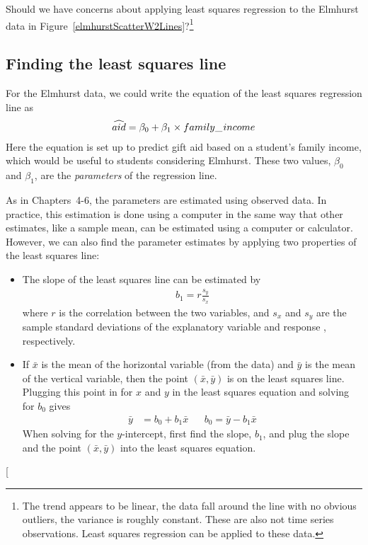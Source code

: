 \begin{exercise}
Should we have concerns about applying least squares regression to the Elmhurst data in Figure~\ref{elmhurstScatterW2Lines}?\footnote{The trend appears to be linear, the data fall around the line with no obvious outliers, the variance is roughly constant. These are also not time series observations. Least squares regression can be applied to these data.}
\end{exercise}

\subsection{Finding the least squares line}
\label{findingTheLeastSquaresLineSection}

For the Elmhurst data, we could write the equation of the least squares regression line as
\begin{eqnarray*}
\widehat{aid} = \beta_0 + \beta_{1}\times family\_\hspace{0.3mm}income
\end{eqnarray*}
Here the equation is set up to predict gift aid based on a student's family income, which would be useful to students considering Elmhurst. These two values, $\beta_0$ and $\beta_1$, are the \emph{parameters} of the regression line.

As in Chapters~4-6, the parameters are estimated using observed data. In practice, this estimation is done using a computer in the same way that other estimates, like a sample mean, can be estimated using a computer or calculator. However, we can also find the parameter estimates by applying two properties of the least squares line:
\begin{itemize}
\item The slope of the least squares line can be estimated by
\begin{eqnarray}
b_1 = r\frac{s_y}{s_x}
\label{slopeOfLSRLine}
\end{eqnarray}
where $r$ is the correlation between the two variables, and $s_x$ and $s_y$ are the sample standard deviations of the explanatory variable %
and response%
, respectively.
\item If $\bar{x}$ is the mean of the horizontal variable (from the data) and $\bar{y}$ is the mean of the vertical variable, then the point $(\bar{x}, \bar{y})$ is on the least squares line. Plugging this point in for $x$ and $y$ in the least squares equation and solving for $b_0$ gives
\begin{align}
\bar{y} &= b_0 + b_1\bar{x}
&&b_0=\bar{y}-b_1\bar{x}
\label{interceptOfLSRLine}
\end{align}
When solving for the $y$-intercept, first find the slope, $b_1$, and plug the slope and the point $(\bar{x}, \bar{y})$ into the least squares equation.
\end{itemize}
\marginpar[\raggedright\vspace{0.5mm}

